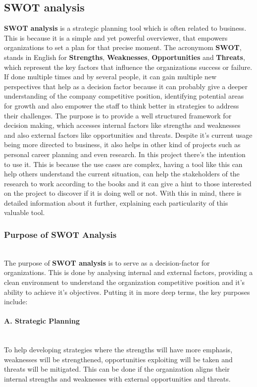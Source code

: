 \subsection{SWOT analysis}
\textbf{SWOT analysis} is a strategic planning tool which is often related to business. This is because it is a simple and yet powerful overviewer, that empowers organizations to set a plan for that precise moment. The acronymom \textbf{SWOT}, stands in English for \textbf{Strengths}, \textbf{Weaknesses}, \textbf{Opportunities} and \textbf{Threats}, which represent the key factors that influence the organizations success or failure. If done multiple times and by several people, it can gain multiple new perspectives that help as a decision factor because it can probably give a deeper understanding of the company competitive position, identifying potential areas for growth and also empower the staff to think better in strategies to address their challenges.
The purpose is to provide a well structured framework for decision making, which accesses internal factors like strengths and weaknesses and also external factors like opportunities and threats.
Despite it's current usage being more directed to business, it also helps in other kind of projects such as personal career planning and even research. In this project there's the intention to use it. This is because the use cases are complex, having a tool like this can help others understand the current situation, can help the stakeholders of the research to work according to the books and it can give a hint to those interested on the project to discover if it is doing well or not. 
With this in mind, there is detailed information about it further, explaining each particularity of this valuable tool.

\subsubsection{Purpose of SWOT Analysis}\mbox{}\\
The purpose of \textbf{SWOT analysis} is to serve as a decision-factor for organizations. This is done by analysing internal and external factors, providing a clean environment to understand the organization competitive position and it's ability to achieve it's objectives. Putting it in more deep terms, the key purposes include:

\paragraph{A. Strategic Planning}\mbox{}\\
To help developing strategies where the strengths will have more emphasis, weaknesses will be strengthened, opportunities exploiting will be taken and threats will be mitigated. This can be done if the organization aligns their internal strengths and weaknesses with external opportunities and threats.

